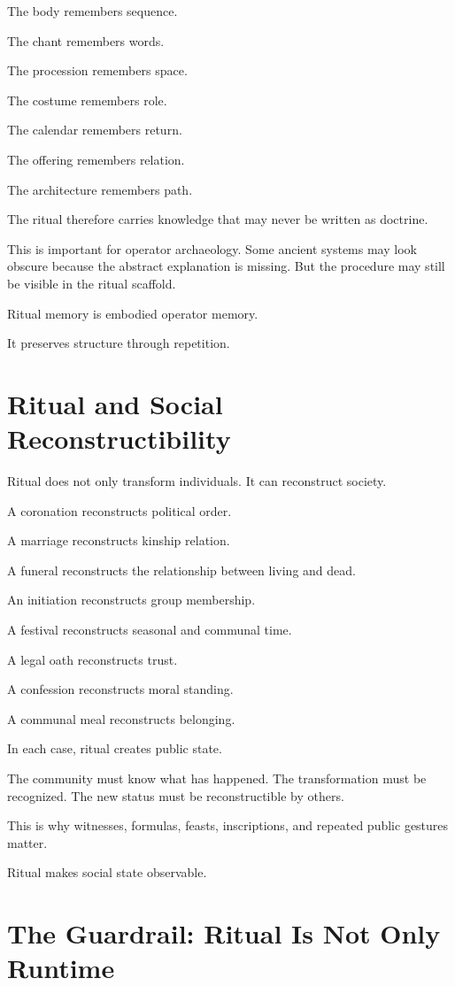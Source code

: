 \documentclass[11pt]{book}
\begin{document}
The body remembers sequence.

The chant remembers words.

The procession remembers space.

The costume remembers role.

The calendar remembers return.

The offering remembers relation.

The architecture remembers path.

The ritual therefore carries knowledge that may never be written as doctrine.

This is important for operator archaeology. Some ancient systems may look obscure because the abstract explanation is missing. But the procedure may still be visible in the ritual scaffold.

Ritual memory is embodied operator memory.

It preserves structure through repetition.

\section{Ritual and Social Reconstructibility}

Ritual does not only transform individuals. It can reconstruct society.

A coronation reconstructs political order.

A marriage reconstructs kinship relation.

A funeral reconstructs the relationship between living and dead.

An initiation reconstructs group membership.

A festival reconstructs seasonal and communal time.

A legal oath reconstructs trust.

A confession reconstructs moral standing.

A communal meal reconstructs belonging.

In each case, ritual creates public state.

The community must know what has happened. The transformation must be recognized. The new status must be reconstructible by others.

This is why witnesses, formulas, feasts, inscriptions, and repeated public gestures matter.

Ritual makes social state observable.

\section{The Guardrail: Ritual Is Not Only Runtime}
\end{document}
